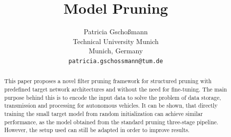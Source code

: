 \documentclass[10pt,twocolumn,letterpaper]{article}
\begin{document}
\title{Model Pruning}
\author{Patricia Gschoßmann\\
	Technical University Munich\\
	Munich, Germany\\
	{\tt\small patricia.gschossmann@tum.de}}

\maketitle

\begin{abstract}
	\noindent
	This paper proposes a novel filter pruning framework for structured pruning with predefined target network architectures and without the need for fine-tuning.
	The main purpose behind this is to encode the input data to solve the problem of data storage, transmission and processing for autonomous vehicles.
	It can be shown, that directly training the small target model from random initialization can achieve similar performance, as the model obtained from the standard pruning three-stage pipeline.
	However, the setup used can still be adapted in order to improve results.
\end{abstract}

\end{document}
